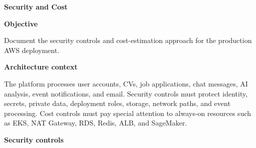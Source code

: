 \vspace{0.5em}\noindent\textbf{Security and Cost}\par

\vspace{0.5em}\noindent\textbf{Objective}\par

Document the security controls and cost-estimation approach for the
production AWS deployment.

\vspace{0.5em}\noindent\textbf{Architecture context}\par

The platform processes user accounts, CVs, job applications, chat
messages, AI analysis, event notifications, and email. Security controls
must protect identity, secrets, private data, deployment roles, storage,
network paths, and event processing. Cost controls must pay special
attention to always-on resources such as EKS, NAT Gateway, RDS, Redis,
ALB, and SageMaker.

\vspace{0.5em}\noindent\textbf{Security controls}\par

